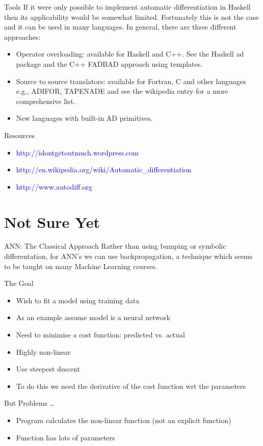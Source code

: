\documentclass{beamer}
\begin{document}
\begin{frame}[fragile]{Tools}
  If it were only possible to implement automatic differentiation in
  Haskell then its applicability would be somewhat
  limited. Fortunately this is not the case and it can be used in many
  languages. In general, there are three different approaches:

\begin{itemize}
\item Operator overloading: available for Haskell and C++. See the
  Haskell ad package and the C++ FADBAD approach using templates.
\item Source to source translators: available for Fortran, C and other
  languages e.g., ADIFOR, TAPENADE and see the wikipedia entry for a
  more comprehensive list.
\item New languages with built-in AD primitives.
\end{itemize}
\end{frame}

\begin{frame}[fragile]{Resources}
\begin{itemize}
\item \textcolor{blue}{http://idontgetoutmuch.wordpress.com}
\item
  \textcolor{blue}{http://en.wikipedia.org/wiki/Automatic\_differentiation}
\item \textcolor{blue}{http://www.autodiff.org}
\end{itemize}
\end{frame}

\section{Not Sure Yet}

\begin{frame}[fragile]{ANN: The Classical Approach}
Rather than using bumping or symbolic differentation, for ANN's we can
use backpropagation, a technique which seems to be taught on many
Machine Learning courses.
\end{frame}

\begin{frame}{The Goal}

  \begin{itemize}
  \item Wish to fit a model using training data
  \item As an example assume model is a neural network
  \item Need to minimise a cost function: predicted vs. actual
  \item Highly non-linear
  \item Use steepest descent
  \item To do this we need the derivative of the cost function wrt the
    parameters
\end{itemize}

\end{frame}

\begin{frame}{But Problems \ldots}
\begin{itemize}
\item
Program calculates the non-linear function (not an explicit function)
\item
Function has lots of parameters
\end{itemize}
\end{frame}
\end{document}
